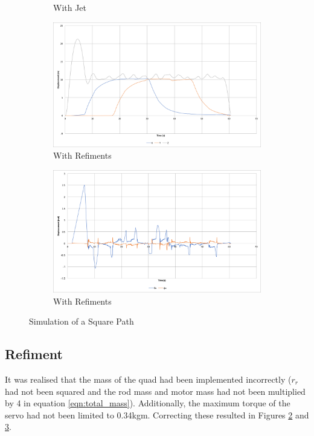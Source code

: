 \documentclass[11pt]{article}
\begin{document}
\begin{figure}[p]
\begin{subfigure}{0.48\textwidth}
        \caption{With Jet}
        \label{fig:square_path_w_jet_angle}
    \end{subfigure}
    \medskip
    \begin{subfigure}{0.48\textwidth}
        \includegraphics[width=\linewidth]{square_path_limited_servos}
        \caption{With Refiments}
        \label{fig:square_path_limited_servos}
    \end{subfigure}\hspace*{\fill}
    \begin{subfigure}{0.48\textwidth}
        \includegraphics[width=\linewidth]{square_path_limited_servos_angle}
        \caption{With Refiments}
        \label{fig:square_path_limited_servos_angle}
    \end{subfigure}

    \caption{Simulation of a Square Path}
    \label{fig:Square Path}
\end{figure}

\subsection{Refiment}
It was realised that the mass of the quad had been implemented incorrectly ($r_r$ had not been squared and the rod mass and motor mass had not been multiplied by 4 in equation \ref{eqn:total_mass}). Additionally, the maximum torque of the servo had not been limited to 0.34kgm. Correcting these resulted in Figures \ref{fig:square_path_limited_servos} and \ref{fig:square_path_limited_servos_angle}.
\end{document}
